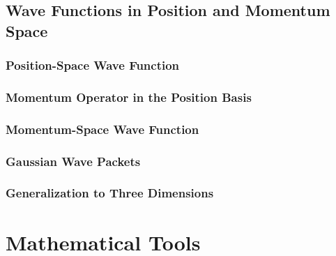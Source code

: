 \documentclass[11pt]{elegantbook}
\begin{document}
\newpage

\section{Wave Functions in Position and Momentum Space}

\subsection{Position-Space Wave Function}

\subsection{Momentum Operator in the Position Basis}

\subsection{Momentum-Space Wave Function}

\subsection{Gaussian Wave Packets}

\subsection{Generalization to Three Dimensions}

\newpage


\nocite{sakurai2020modern, dirac1981principles}
\printbibliography[heading=bibintoc, title=\ebibname]

\appendix

\chapter{Mathematical Tools}
\end{document}
